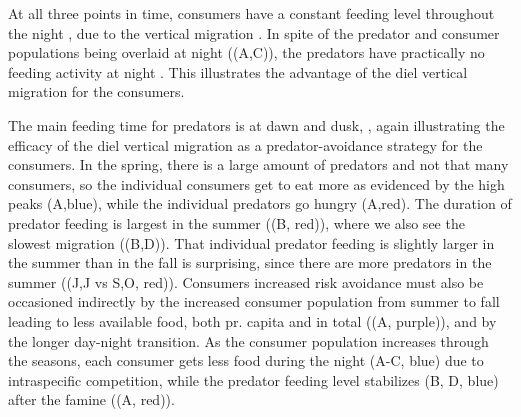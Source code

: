 At all three points in time, consumers have a constant feeding level throughout the night , due to the vertical migration . In spite of the predator and consumer populations being overlaid at night ((A,C)), the predators have practically no feeding activity at night . This illustrates the advantage of the diel vertical migration for the consumers.

The main feeding time for predators is at dawn and dusk, , again illustrating the efficacy of the diel vertical migration as a predator-avoidance strategy for the consumers. In the spring, there is a large amount of predators and not that many consumers, so the individual consumers get to eat more as evidenced by the high peaks (A,blue), while the individual predators go hungry (A,red). The duration of predator feeding is largest in the summer ((B, red)), where we also see the slowest migration ((B,D)). That individual predator feeding is slightly larger in the summer than in the fall is surprising, since there are more predators in the summer ((J,J vs S,O, red)). Consumers increased risk avoidance must also be occasioned indirectly by the increased consumer population from summer to fall leading to less available food, both pr. capita and in total ((A, purple)), and by the longer day-night transition. As the consumer population increases through the seasons, each consumer gets less food during the night (A-C, blue) due to intraspecific competition, while the predator feeding level stabilizes (B, D, blue) after the famine ((A, red)).

